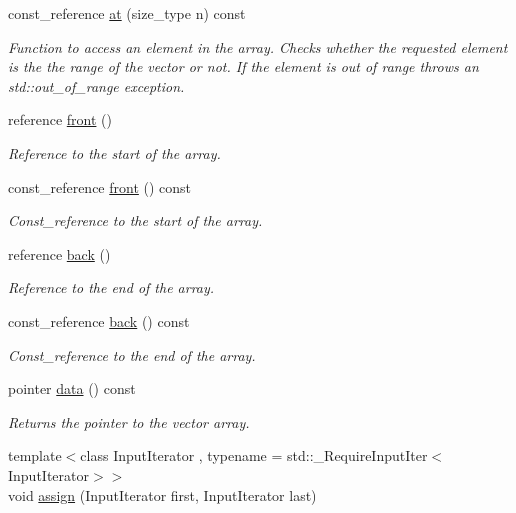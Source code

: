 \begin{DoxyCompactItemize}
const\+\_\+reference \mbox{\hyperlink{classfake_1_1vector_a471d597c2a40234bbe86179b97d0dcbf}{at}} (size\+\_\+type n) const
\begin{DoxyCompactList}\small\item\em Function to access an element in the array. Checks whether the requested element is the the range of the vector or not. If the element is out of range throws an std\+::out\+\_\+of\+\_\+range exception. \end{DoxyCompactList}\item 
reference \mbox{\hyperlink{classfake_1_1vector_aaa9e6a27783f8b72c203ae3fe7ad0859}{front}} ()
\begin{DoxyCompactList}\small\item\em Reference to the start of the array. \end{DoxyCompactList}\item 
const\+\_\+reference \mbox{\hyperlink{classfake_1_1vector_a8b0b97b9c2b8a83c6b3ee6865a61c25a}{front}} () const
\begin{DoxyCompactList}\small\item\em Const\+\_\+reference to the start of the array. \end{DoxyCompactList}\item 
reference \mbox{\hyperlink{classfake_1_1vector_a4c67f42f60eb6ea322065aa6c87315b7}{back}} ()
\begin{DoxyCompactList}\small\item\em Reference to the end of the array. \end{DoxyCompactList}\item 
const\+\_\+reference \mbox{\hyperlink{classfake_1_1vector_a819b07f7862e65796d7457a6964f2ea4}{back}} () const
\begin{DoxyCompactList}\small\item\em Const\+\_\+reference to the end of the array. \end{DoxyCompactList}\item 
pointer \mbox{\hyperlink{classfake_1_1vector_a308cb3c0d13198a2a968a5239bf416a0}{data}} () const
\begin{DoxyCompactList}\small\item\em Returns the pointer to the vector array. \end{DoxyCompactList}\item 
{\footnotesize template$<$class Input\+Iterator , typename  = std\+::\+\_\+\+Require\+Input\+Iter$<$\+Input\+Iterator$>$$>$ }\\void \mbox{\hyperlink{classfake_1_1vector_a69ef51571cb66b677e3a05ff510a73a3}{assign}} (Input\+Iterator first, Input\+Iterator last)

\end{DoxyCompactItemize}
